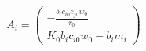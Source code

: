 \documentclass{article}
\begin{document}
\[
  A_i = \left(\begin{array}{r}
-\frac{b_{i} {c_{i0}} {c_{j0}} w_{0}}{r_{0}} \\
K_{0} b_{i} {c_{i0}} w_{0} - b_{i} m_{i}
\end{array}\right)
\]
\end{document}
